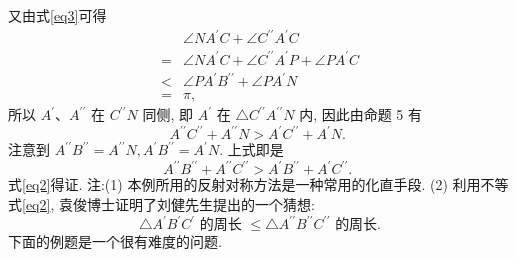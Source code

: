 又由式\ref{eq3}可得
$$
\begin{aligned}
& \angle N A^{\prime} C+\angle C^{\prime \prime} A^{\prime} C \\
= & \angle N A^{\prime} C+\angle C^{\prime \prime} A^{\prime} P+\angle P A^{\prime} C \\
< & \angle P A^{\prime} B^{\prime \prime}+\angle P A^{\prime} N \\
= & \pi,
\end{aligned}
$$
所以 $A^{\prime} 、 A^{\prime \prime}$ 在 $C^{\prime \prime} N$ 同侧, 即 $A^{\prime}$ 在 $\triangle C^{\prime \prime} A^{\prime \prime} N$ 内, 因此由命题 5 有
$$
A^{\prime \prime} C^{\prime \prime}+A^{\prime \prime} N>A^{\prime} C^{\prime \prime}+A^{\prime} N \text {. }
$$
注意到 $A^{\prime \prime} B^{\prime \prime}=A^{\prime \prime} N, A^{\prime} B^{\prime \prime}=A^{\prime} N$. 上式即是
$$
A^{\prime \prime} B^{\prime \prime}+A^{\prime \prime} C^{\prime \prime}>A^{\prime} B^{\prime \prime}+A^{\prime} C^{\prime \prime} \text {. }
$$
式\ref{eq2}得证.
注:(1) 本例所用的反射对称方法是一种常用的化直手段.
(2) 利用不等式\ref{eq2}, 袁俊博士证明了刘健先生提出的一个猜想:
$$
\triangle A^{\prime} B^{\prime} C^{\prime} \text { 的周长 } \leqslant \triangle A^{\prime \prime} B^{\prime \prime} C^{\prime \prime} \text { 的周长.
}
$$
下面的例题是一个很有难度的问题.



